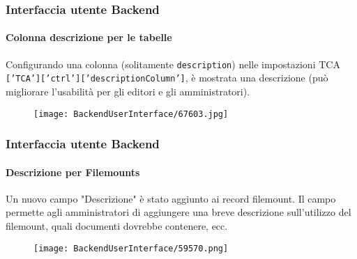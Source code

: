 \begin{frame}[fragile]
	\frametitle{Interfaccia utente Backend}
	\framesubtitle{Colonna descrizione per le tabelle}

	Configurando una colonna (solitamente \texttt{description}) nelle impostazioni TCA \texttt{['TCA']['ctrl']['descriptionColumn']},
	è mostrata una descrizione (può migliorare l'usabilità per gli editori e gli amministratori).

	\begin{figure}
		\texttt{[image: BackendUserInterface/67603.jpg]}
	\end{figure}

\end{frame}

\begin{frame}[fragile]
	\frametitle{Interfaccia utente Backend}
	\framesubtitle{Descrizione per Filemounts}

	Un nuovo campo "Descrizione" è stato aggiunto ai record filemount.
	Il campo permette agli amministratori di aggiungere una breve descrizione sull'utilizzo del filemount,
	quali documenti dovrebbe contenere, ecc.

	\begin{figure}
		\texttt{[image: BackendUserInterface/59570.png]}
	\end{figure}

\end{frame}

